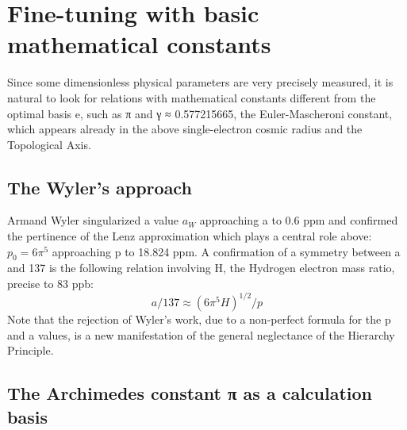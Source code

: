 \chapter{Fine-tuning with basic mathematical constants}
\label{chap:chapter_3}

Since some dimensionless physical parameters are very precisely measured, it is natural to look for
relations with mathematical constants different from the optimal basis e, such as π and γ ≈
0.577215665, the Euler-Mascheroni constant, which appears already in the above single-electron
cosmic radius and the Topological Axis.

\section {The Wyler's approach}

Armand Wyler singularized a value $a_{W}$ approaching a to 0.6 ppm and confirmed the pertinence
of the Lenz approximation which plays a central role above: $p_{0} = 6\pi^{5}$ approaching p to 18.824 ppm.
A confirmation of a symmetry between a and 137 is the following relation involving H, the
Hydrogen electron mass ratio, precise to 83 ppb:
$$a/137 ≈ (6\pi^{5} H)^{1/2} /p$$
Note that the rejection of Wyler's work, due to a non-perfect formula for the p and a values, is a new
manifestation of the general neglectance of the Hierarchy Principle.

\section {The Archimedes constant π as a calculation basis}

